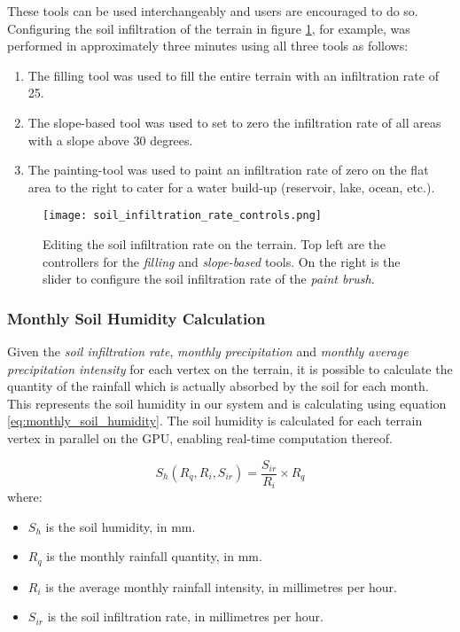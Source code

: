 These tools can be used interchangeably and users are encouraged to do so. Configuring the soil infiltration of the terrain in figure \ref{fig:soil_infiltration_controls}, for example, was performed in approximately three minutes using all three tools as follows:
\begin{enumerate}
\item The filling tool was used to fill the entire terrain with an infiltration rate of 25.\\
\item The slope-based tool was used to set to zero the infiltration rate of all areas with a slope above 30 degrees.\\
\item The painting-tool was used to paint an infiltration rate of zero on the flat area to the right to cater for a water build-up (reservoir, lake, ocean, etc.).\\
\end{enumerate}

\begin{figure}
\center
	\texttt{[image: soil\_infiltration\_rate\_controls.png]}
	\caption{ Editing the soil infiltration rate on the terrain. Top left are the controllers for the \textit{filling} and \textit{slope-based} tools. On the right is the slider to configure the soil infiltration rate of the \textit{paint brush}. }
	\label{fig:soil_infiltration_controls}
\end{figure}

\subsubsection{Monthly Soil Humidity Calculation}

Given the \textit{soil infiltration rate}, \textit{monthly precipitation} and \textit{monthly average precipitation intensity} for each vertex on the terrain, it is possible to calculate the quantity of the rainfall which is actually absorbed by the soil for each month. This represents the soil humidity in our system and is calculating using equation \ref{eq:monthly_soil_humidity}. The soil humidity is calculated for each terrain vertex in parallel on the GPU, enabling real-time computation thereof.

\begin{equation} \label{eq:monthly_soil_humidity}
	S_{h}(R_{q},R_{i},S_{ir}) = 
	\frac{S_{ir}}{R_{i}} \times R_{q}
\end{equation}
where:
\begin{itemize}
\item \textit{$S_{h}$} is the soil humidity, in mm.\\
\item \textit{$R_{q}$} is the monthly rainfall quantity, in mm. \\
\item \textit{$R_{i}$} is the average monthly rainfall intensity, in millimetres per hour.\\
\item \textit{$S_{ir}$} is the soil infiltration rate, in millimetres per hour.\\
\end{itemize}

